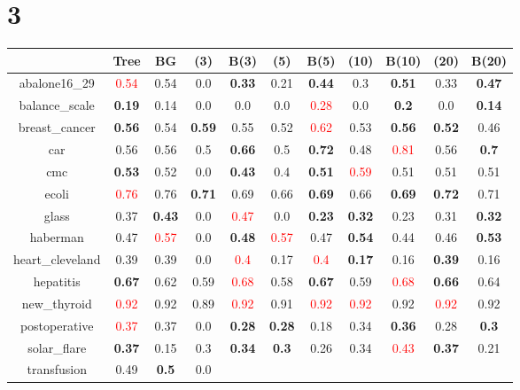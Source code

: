 \documentclass{article}%
\begin{document}
\section*{3}%
\begin{tabular}{c|cccccccccc}%
\hline%
&Tree&BG&(3)&B(3)&(5)&B(5)&(10)&B(10)&(20)&B(20)\\%
\hline%
abalone16\_29&\textcolor{red}{ 
0.54
}&0.54&0.0&\textbf{0.33}&0.21&\textbf{0.44}&0.3&\textbf{0.51}&0.33&\textbf{0.47}\\%
\hline%
balance\_scale&\textbf{0.19}&0.14&0.0&0.0&0.0&\textcolor{red}{ 
0.28
}&0.0&\textbf{0.2}&0.0&\textbf{0.14}\\%
\hline%
breast\_cancer&\textbf{0.56}&0.54&\textbf{0.59}&0.55&0.52&\textcolor{red}{ 
0.62
}&0.53&\textbf{0.56}&\textbf{0.52}&0.46\\%
\hline%
car&0.56&0.56&0.5&\textbf{0.66}&0.5&\textbf{0.72}&0.48&\textcolor{red}{ 
0.81
}&0.56&\textbf{0.7}\\%
\hline%
cmc&\textbf{0.53}&0.52&0.0&\textbf{0.43}&0.4&\textbf{0.51}&\textcolor{red}{ 
0.59
}&0.51&0.51&0.51\\%
\hline%
ecoli&\textcolor{red}{ 
0.76
}&0.76&\textbf{0.71}&0.69&0.66&\textbf{0.69}&0.66&\textbf{0.69}&\textbf{0.72}&0.71\\%
\hline%
glass&0.37&\textbf{0.43}&0.0&\textcolor{red}{ 
0.47
}&0.0&\textbf{0.23}&\textbf{0.32}&0.23&0.31&\textbf{0.32}\\%
\hline%
haberman&0.47&\textcolor{red}{ 
0.57
}&0.0&\textbf{0.48}&\textcolor{red}{ 
0.57
}&0.47&\textbf{0.54}&0.44&0.46&\textbf{0.53}\\%
\hline%
heart\_cleveland&0.39&0.39&0.0&\textcolor{red}{ 
0.4
}&0.17&\textcolor{red}{ 
0.4
}&\textbf{0.17}&0.16&\textbf{0.39}&0.16\\%
\hline%
hepatitis&\textbf{0.67}&0.62&0.59&\textcolor{red}{ 
0.68
}&0.58&\textbf{0.67}&0.59&\textcolor{red}{ 
0.68
}&\textbf{0.66}&0.64\\%
\hline%
new\_thyroid&\textcolor{red}{ 
0.92
}&0.92&0.89&\textcolor{red}{ 
0.92
}&0.91&\textcolor{red}{ 
0.92
}&\textcolor{red}{ 
0.92
}&0.92&\textcolor{red}{ 
0.92
}&0.92\\%
\hline%
postoperative&\textcolor{red}{ 
0.37
}&0.37&0.0&\textbf{0.28}&\textbf{0.28}&0.18&0.34&\textbf{0.36}&0.28&\textbf{0.3}\\%
\hline%
solar\_flare&\textbf{0.37}&0.15&0.3&\textbf{0.34}&\textbf{0.3}&0.26&0.34&\textcolor{red}{ 
0.43
}&\textbf{0.37}&0.21\\%
\hline%
transfusion&0.49&\textbf{0.5}&0.0&\textcolor{red}{ 
}
\end{tabular}
\end{document}
